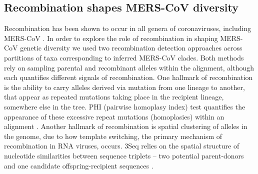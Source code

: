 \documentclass[11pt,oneside,letterpaper]{article}
\def\tbc#1{\textcolor{purple}{[#1]}}
\begin{document}
%



\subsection*{Recombination shapes MERS-CoV diversity}
Recombination has been shown to occur in all genera of coronaviruses, including MERS-CoV \citep{lai_1985,makino_1986,keck_1988,kottier_1995,herrewegh_1998}. %
In order to explore the role of recombination in shaping MERS-CoV genetic diversity we used two recombination detection approaches across partitions of taxa corresponding to inferred MERS-CoV clades.
Both methods rely on sampling parental and recombinant alleles within the alignment, although each quantifies different signals of recombination.
One hallmark of recombination is the ability to carry alleles derived via mutation from one lineage to another, that appear as repeated mutations taking place in the recipient lineage, somewhere else in the tree.
PHI (pairwise homoplasy index) test quantifies the appearance of these excessive repeat mutations (homoplasies) within an alignment \citep{bruen_simple_2006}.
Another hallmark of recombination is spatial clustering of alleles in the genome, due to how template switching, the primary mechanism of recombination in RNA viruses, occurs.
3Seq relies on the spatial structure of nucleotide similarities between sequence triplets -- two potential parent-donors and one candidate offspring-recipient sequences \citep{boni_exact_2007}.
\end{document}
